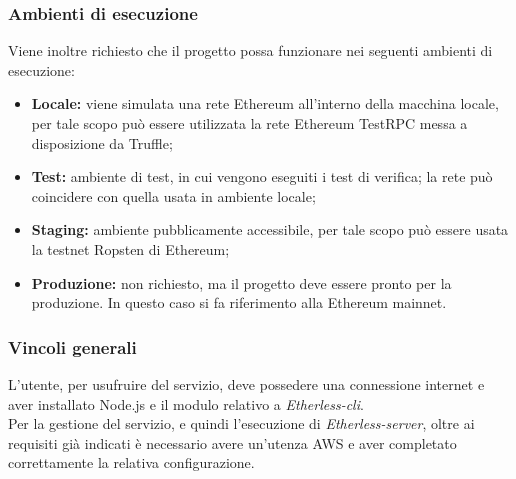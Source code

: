 \subsubsection{Ambienti di esecuzione}
Viene inoltre richiesto che il progetto possa funzionare nei seguenti ambienti di esecuzione: 
	\begin{itemize}
		\item \textbf{Locale:} viene simulata una rete Ethereum all'interno della macchina locale, per tale scopo può essere utilizzata la rete Ethereum TestRPC messa a disposizione da Truffle; 
		\item \textbf{Test:} ambiente di test, in cui vengono eseguiti i test di verifica; la rete può coincidere con quella usata in ambiente locale; 
		\item \textbf{Staging:} ambiente pubblicamente accessibile, per tale scopo può essere usata la testnet Ropsten di Ethereum;
		\item \textbf{Produzione:} non richiesto, ma il progetto deve essere pronto per la produzione. In questo caso si fa riferimento alla Ethereum mainnet. 
	\end{itemize}

\subsubsection{Vincoli generali}
L'utente, per usufruire del servizio, deve possedere una connessione internet e aver installato Node.js e il modulo relativo a \textit{Etherless-cli}. \\ 
Per la gestione del servizio, e quindi l'esecuzione di \textit{Etherless-server}, oltre ai requisiti già indicati è necessario avere un'utenza AWS e aver completato correttamente la relativa configurazione. 
